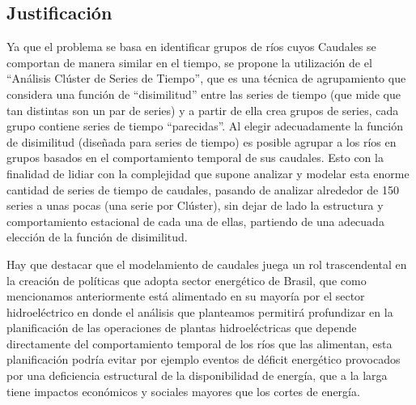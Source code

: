 \documentclass[10pt,a4paper]{article}
\begin{document}
\subsection{Justificación}
Ya que el problema se basa en identificar grupos de ríos cuyos Caudales se comportan de manera similar en el tiempo, se propone la utilización de el “Análisis Clúster de Series de Tiempo”, que es una técnica de agrupamiento que considera una función de “disimilitud” entre las series de tiempo (que mide que tan distintas son un par de series) y a partir de ella crea grupos de series, cada grupo contiene series de tiempo “parecidas”. Al elegir adecuadamente la función de disimilitud (diseñada para series de tiempo) es posible agrupar a los ríos en grupos basados en el comportamiento temporal de sus caudales. Esto con la finalidad de lidiar con la complejidad que supone analizar y modelar esta enorme cantidad de series de tiempo de caudales, pasando de analizar alrededor de 150 series a unas pocas (una serie por Clúster), sin dejar de lado la estructura y comportamiento estacional de cada una de ellas, partiendo de una adecuada elección de la función de disimilitud.

Hay que destacar que el modelamiento de caudales juega un rol trascendental en la creación de políticas que adopta sector energético de Brasil, que como mencionamos anteriormente está alimentado en su mayoría por el sector hidroeléctrico en donde el análisis que planteamos permitirá profundizar en la planificación de las operaciones de plantas hidroeléctricas que depende directamente del comportamiento temporal de los ríos que las alimentan, esta planificación podría evitar por ejemplo eventos de déficit energético provocados por una deficiencia estructural de la disponibilidad de energía, que a la larga tiene impactos económicos y sociales mayores que los cortes de energía.


\end{document}
